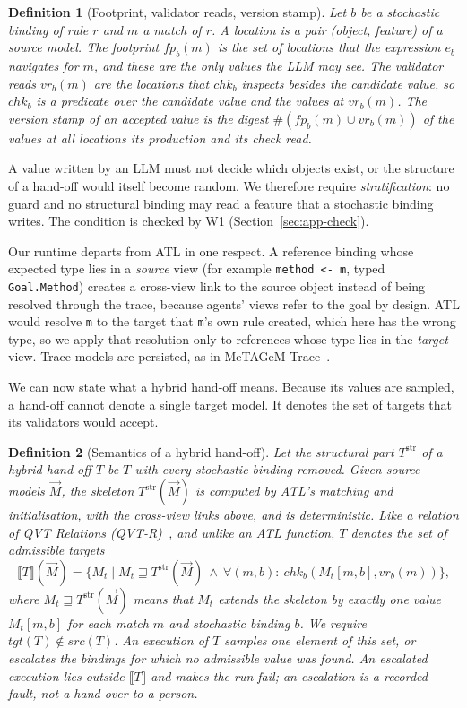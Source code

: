 \documentclass[pdflatex,sn-mathphys-num]{sn-jnl}
\theoremstyle{thmstyleone}%
\theoremstyle{thmstyletwo}%
\theoremstyle{thmstylethree}%
\newtheorem{definition}{Definition}%
\newcommand{\W}[1]{\textsf{W#1}}
\newcommand{\fp}{\mathit{fp}}
\newcommand{\chk}{\mathit{chk}}
\newcommand{\code}[1]{\texttt{#1}}
\begin{document}
\begin{definition}[Footprint, validator reads, version stamp]\label{def:footprint}
Let $b$ be a stochastic binding of rule $r$ and $m$ a match of $r$. A
\emph{location} is a pair (object, feature) of a source model. The
\emph{footprint} $\fp_b(m)$ is the set of locations that the expression $e_b$
navigates for $m$, and these are the only values the LLM may see. The
\emph{validator reads} $\mathit{vr}_b(m)$ are the locations that $\chk_b$
inspects besides the candidate value, so $\chk_b$ is a predicate over the
candidate value and the values at $\mathit{vr}_b(m)$. The \emph{version stamp}
of an accepted value is the digest $\#(\fp_b(m)\cup\mathit{vr}_b(m))$ of the
values at all locations its production and its check read.
\end{definition}

A value written by an LLM must not decide which objects exist, or the
structure of a hand-off would itself become random. We therefore require
\emph{stratification}: no guard and no structural binding may read a feature
that a stochastic binding writes. The condition is checked by \W{1}
(Section~\ref{sec:app-check}).

Our runtime departs from ATL in one respect. A reference binding whose expected
type lies in a \emph{source} view (for example \code{method <- m}, typed
\code{Goal.Method}) creates a cross-view link to the source object instead of
being resolved through the trace, because agents' views refer to the goal by
design. ATL would resolve \code{m} to the target that \code{m}'s own rule
created, which here has the wrong type, so we apply that resolution only to
references whose type lies in the \emph{target} view. Trace models are
persisted, as in MeTAGeM-Trace~\cite{vara2014metagem}.

We can now state what a hybrid hand-off means. Because its values are sampled,
a hand-off cannot denote a single target model. It denotes the set of targets
that its validators would accept.

\begin{definition}[Semantics of a hybrid hand-off]\label{def:hsem}
Let the \emph{structural part} $T^{\mathrm{str}}$ of a hybrid hand-off $T$ be
$T$ with every stochastic binding removed. Given source models $\vec M$, the
\emph{skeleton} $T^{\mathrm{str}}(\vec M)$ is computed by ATL's matching and
initialisation, with the cross-view links above, and is deterministic. Like a
relation of QVT Relations (QVT-R)~\cite{omg2016qvt,stevens2010qvt}, and unlike
an ATL function, $T$ denotes the \emph{set} of admissible targets
\[\llbracket T\rrbracket(\vec M)=\{M_t\mid M_t\sqsupseteq T^{\mathrm{str}}(\vec M)\ \wedge\ \forall(m,b):\ \chk_b(M_t[m,b],\mathit{vr}_b(m))\},\]
where $M_t\sqsupseteq T^{\mathrm{str}}(\vec M)$ means that $M_t$ extends the
skeleton by exactly one value $M_t[m,b]$ for each match $m$ and stochastic
binding $b$. We require $\mathit{tgt}(T)\notin\mathit{src}(T)$. An execution
of $T$ samples one element of this set, or \emph{escalates} the bindings for
which no admissible value was found. An escalated execution lies outside
$\llbracket T\rrbracket$ and makes the run fail; an escalation is a recorded
fault, not a hand-over to a person.
\end{definition}
\end{document}
